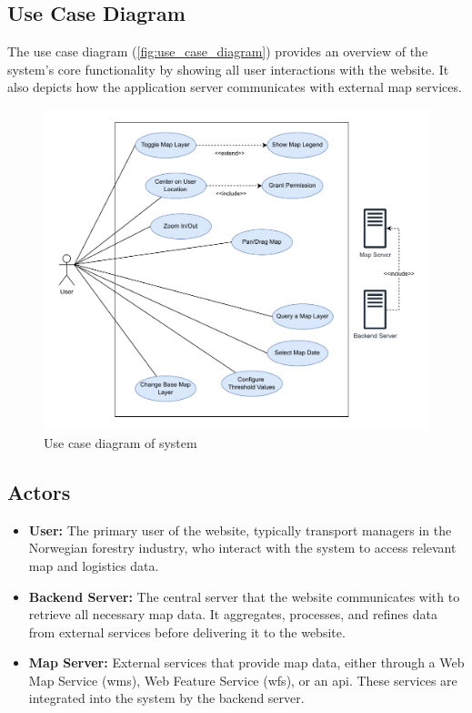 \subsection{Use Case Diagram}
The use case diagram (\autoref{fig:use_case_diagram}) provides an overview of the system's core functionality by showing all user interactions with the website. It also depicts how the application server communicates with external map services.


\begin{figure}[h]
    \centering
    \includegraphics[width=1\linewidth]{figures/skogkurs_use_case.pdf}
    \caption{Use case diagram of system}
    \label{fig:use_case_diagram}
\end{figure}

\subsection{Actors}

\begin{itemize}
    \item \textbf{User:} The primary user of the website, typically transport managers in the Norwegian forestry industry, who interact with the system to access relevant map and logistics data.
    \item \textbf{Backend Server:} The central server that the website communicates with to retrieve all necessary map data. It aggregates, processes, and refines data from external services before delivering it to the website.
    \item \textbf{Map Server:} External services that provide map data, either through a Web Map Service (\Gls{wms}), Web Feature Service (\Gls{wfs}), or an \acrshort{api}. These services are integrated into the system by the backend server.
\end{itemize}

